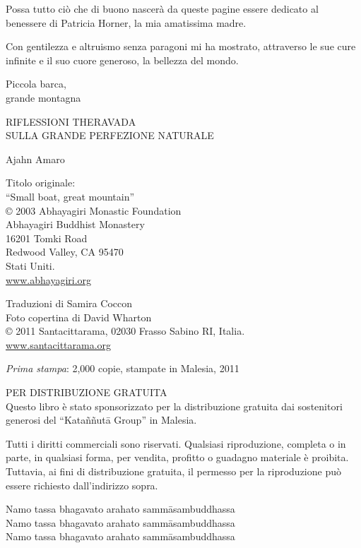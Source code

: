 
\thispagestyle{empty}\mbox{}\newpage
\thispagestyle{empty}\mbox{}\newpage

\thispagestyle{empty}
{\itshape\setlength{\parindent}{0em}
\vspace*{2em}

Possa tutto ciò che di buono nascerà da queste pagine essere dedicato al benessere di Patricia Horner, la mia amatissima madre.

Con gentilezza e altruismo senza paragoni mi ha mostrato, attraverso le sue cure infinite e il suo cuore generoso, la bellezza del mondo.

}

\thispagestyle{empty}\mbox{}\newpage\thispagestyle{empty}
\mbox{}\newpage\thispagestyle{empty}
{\raggedleft
\vspace*{2em}

{\HUGE Piccola barca,\\ \bigskip grande montagna}

\vspace*{5em}

{\LARGE RIFLESSIONI THERAVADA \\ \bigskip SULLA GRANDE PERFEZIONE NATURALE}

\vspace*{8em}

{\LARGE Ajahn Amaro}

}
\newpage\thispagestyle{empty}
{\raggedright\setlength{\parindent}{0em}\setlength{\parskip}{1em}

Titolo originale: \\
``Small boat, great mountain'' \\
\copyright{} 2003 Abhayagiri Monastic Foundation \\
Abhayagiri Buddhist Monastery \\
16201 Tomki Road \\
Redwood Valley, CA 95470 \\
Stati Uniti. \\
\href{http://www.abhayagiri.org}{www.abhayagiri.org}

Traduzioni di Samira Coccon \\
Foto copertina di David Wharton \\

\copyright{} 2011 Santacittarama, 02030 Frasso Sabino RI, Italia. \\
\href{http://www.santacittarama.org}{www.santacittarama.org}

\vfill

\textit{Prima stampa}: 2,000 copie, stampate in Malesia, 2011

PER DISTRIBUZIONE GRATUITA \\
Questo libro è stato sponsorizzato per la distribuzione gratuita dai sostenitori generosi del ``Kata\~n\~nut\=a Group'' in Malesia. 

Tutti i diritti commerciali sono riservati. Qualsiasi riproduzione, completa o in parte, in qualsiasi forma, per vendita, profitto o guadagno materiale è proibita. Tuttavia, ai fini di distribuzione gratuita, il permesso per la riproduzione può essere richiesto dall'indirizzo sopra.

}
\newpage\thispagestyle{empty}
{\centering

Namo tassa bhagavato arahato samm\=asambuddhassa \\
Namo tassa bhagavato arahato samm\=asambuddhassa \\
Namo tassa bhagavato arahato samm\=asambuddhassa 

}\newpage
